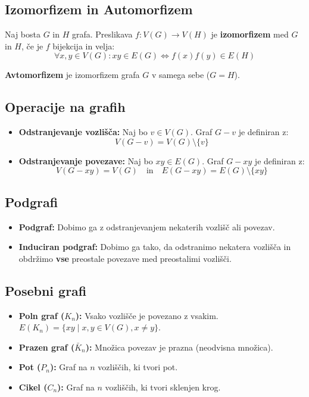 \documentclass[11pt,paper=b5,DIV=13,headinclude,footinclude]{scrbook}
\begin{document}
\subsection{Izomorfizem in Automorfizem}

Naj bosta $G$ in $H$ grafa. Preslikava $f: V(G) \to V(H)$ je \textbf{izomorfizem} med $G$ in $H$, če je $f$ bijekcija in velja:
\[ \forall x, y \in V(G): xy \in E(G) \iff f(x)f(y) \in E(H) \]

\textbf{Avtomorfizem} je izomorfizem grafa $G$ v samega sebe ($G = H$).

\subsection{Operacije na grafih}

\begin{itemize}
    \item \textbf{Odstranjevanje vozlišča:} Naj bo $v \in V(G)$. Graf $G - v$ je definiran z:
    \[ V(G - v) = V(G) \setminus \{v\} \]
    \item \textbf{Odstranjevanje povezave:} Naj bo $xy \in E(G)$. Graf $G - xy$ je definiran z:
    \[ V(G - xy) = V(G) \quad \text{in} \quad E(G - xy) = E(G) \setminus \{xy\} \]
\end{itemize}

\subsection{Podgrafi}

\begin{itemize}
    \item \textbf{Podgraf:} Dobimo ga z odstranjevanjem nekaterih vozlišč ali povezav.
    \item \textbf{Induciran podgraf:} Dobimo ga tako, da odstranimo nekatera vozlišča in obdržimo \textbf{vse} preostale povezave med preostalimi vozlišči.
\end{itemize}

\subsection{Posebni grafi}

\begin{itemize}
    \item \textbf{Poln graf ($K_n$):} Vsako vozlišče je povezano z vsakim. $E(K_n) = \{xy \mid x, y \in V(G), x \neq y\}$.
    \item \textbf{Prazen graf ($\bar{K}_n$):} Množica povezav je prazna (neodvisna množica).
    \item \textbf{Pot ($P_n$):} Graf na $n$ vozliščih, ki tvori pot.
    \item \textbf{Cikel ($C_n$):} Graf na $n$ vozliščih, ki tvori sklenjen krog.
\end{itemize}
\end{document}
